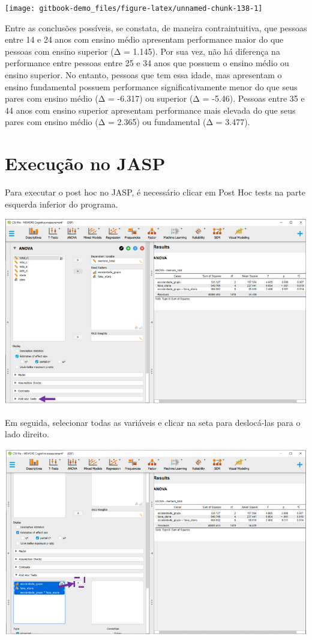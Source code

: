 \documentclass[
]{book}
\begin{document}
\begin{center}\texttt{[image: gitbook-demo\_files/figure-latex/unnamed-chunk-138-1]} \end{center}

Entre as conclusões possíveis, se constata, de maneira contraintuitiva, que pessoas entre 14 e 24 anos com ensino médio apresentam performance maior do que pessoas com ensino superior (Δ = 1.145). Por sua vez, não há diferença na performance entre pessoas entre 25 e 34 anos que possuem o ensino médio ou ensino superior. No entanto, pessoas que tem essa idade, mas apresentam o ensino fundamental possuem performance significativamente menor do que seus pares com ensino médio (Δ = -6.317) ou superior (Δ = -5.46). Pessoas entre 35 e 44 anos com ensino superior apresentam performance mais elevada do que seus pares com ensino médio (Δ = 2.365) ou fundamental (Δ = 3.477).

\hypertarget{execuuxe7uxe3o-no-jasp-10}{%
\section{Execução no JASP}\label{execuuxe7uxe3o-no-jasp-10}}

Para executar o post hoc no JASP, é necessário clicar em Post Hoc tests na parte esquerda inferior do programa.

\includegraphics{./img/cap_anova_fatorial_posthoc.png}

Em seguida, selecionar todas as variáveis e clicar na seta para deslocá-las para o lado direito.

\includegraphics{./img/cap_anova_fatorial_posthoc2.png}
\end{document}
